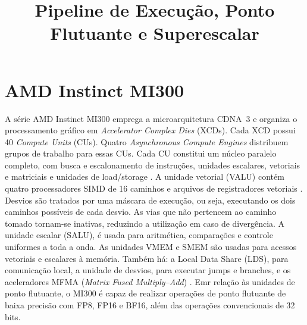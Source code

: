 \documentclass[conference]{IEEEtran}
\title{Pipeline de Execução, Ponto Flutuante e Superescalar}
\author{\IEEEauthorblockN{Autor}
\IEEEauthorblockA{Universidade de Brasília\\
}}
\begin{document}
\maketitle

\section{AMD Instinct MI300}

A série AMD Instinct MI300 emprega a microarquitetura CDNA~3 e organiza o
processamento gráfico em \emph{Accelerator Complex Dies} (XCDs). Cada XCD
possui 40 \emph{Compute Units} (CUs). Quatro \emph{Asynchronous Compute Engines} distribuem grupos de trabalho para essas
CUs. Cada CU constitui um núcleo paralelo completo, com busca e escalonamento de
instruções, unidades escalares, vetoriais e matriciais e unidades de
load/storage \cite{amd-cdna3-whitepaper}. A unidade vetorial (VALU) contém quatro
processadores SIMD de 16 caminhos e arquivos de registradores vetoriais \cite{amd-pipelines}. 
Desvios são tratados por uma máscara de execução, ou seja, executando os dois caminhos possíveis de cada desvio. 
As vias que não pertencem ao caminho tomado tornam-se inativas, reduzindo a
utilização em caso de divergência. A unidade escalar (SALU), é usada para
aritmética, comparações e controle uniformes a toda a onda. As unidades
VMEM e SMEM são usadas para acessos vetoriais e escalares à memória. Também há: a Local Data Share (LDS), para
comunicação local, a unidade de desvios, para executar jumps e branches, e os aceleradores MFMA (\emph{Matrix Fused Multiply--Add}) \cite{amd-cu,amd-pipelines}.
Emr relação às unidades de ponto flutuante, o MI300 é capaz de realizar operações de ponto flutuante de baixa precisão com FP8, FP16 e BF16, além das operações convencionais de 32 bits.



\end{document}
